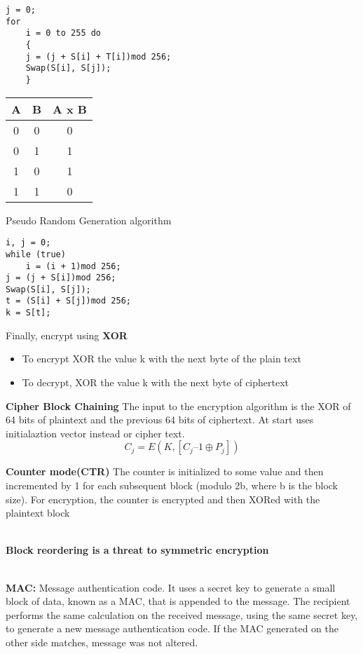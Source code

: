 \documentclass[10pt,landscape]{article}
\begin{document}
\begin{multicols}{3}
\lstset{language=bash,label= ,caption= ,captionpos=b,numbers=none}
\begin{lstlisting}
j = 0;
for
    i = 0 to 255 do
    {
    j = (j + S[i] + T[i])mod 256;
    Swap(S[i], S[j]);
    }
\end{lstlisting}


\begin{wraptable}{r}{2.5cm}
\begin{tabular}{ |c|c|c| } 
 \hline
 A & B & A x B \\ 
 \hline
 0 & 0 & 0 \\ 
 0 & 1 & 1 \\ 
 1 & 0 & 1 \\ 
 1 & 1 & 0 \\ 
 \hline
\end{tabular}
\end{wraptable}

Pseudo Random Generation algorithm
\lstset{language=bash,label= ,caption= ,captionpos=b,numbers=none}
\begin{lstlisting}
i, j = 0;
while (true)
    i = (i + 1)mod 256;
j = (j + S[i])mod 256;
Swap(S[i], S[j]);
t = (S[i] + S[j])mod 256;
k = S[t];
\end{lstlisting}
Finally, encrypt using \textbf{XOR}


\begin{itemize}
\item To encrypt XOR the value k with the next byte of the plain text
\item To decrypt, XOR the value k with the next byte of ciphertext
\end{itemize}

\textbf{Cipher Block Chaining} The input to the encryption algorithm is the XOR of 64 bits of
plaintext and the previous 64 bits of ciphertext. At start uses initialaztion vector instead or cipher text.
\lstset{language=bash,label= ,caption= ,captionpos=b,numbers=none}
\[C_j= E(K, [C_j–1 \oplus P_j])\]

\textbf{Counter mode(CTR)} The counter is initialized to some value and then incremented by 1 for
each subsequent block (modulo 2b, where b is the block size). For encryption, the counter is
encrypted and then XORed with the plaintext block

~\\
\textbf{Block reordering is a threat to symmetric encryption}

~\\

\textbf{MAC:} Message authentication code. It uses a secret key to
generate a small block of data, known as a MAC, that is appended to
the message. The recipient performs the same calculation on the
received message, using the same secret key, to generate a new message
authentication code. If the MAC generated on the other side matches,
message was not altered.


\end{multicols}
\end{document}
